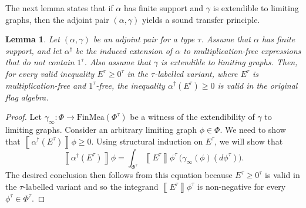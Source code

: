 \documentclass{article}
\newtheorem{lem}[thm]{Lemma}
\newcommand*{\db}[1]{\left\llbracket #1 \right\rrbracket}
\newcommand*{\FinMea}{\mathrm{FinMea}}
\begin{document}
The next lemma states that if $\alpha$ has finite support and $\gamma$ is extendible to limiting graphs, then the adjoint pair $(\alpha,\gamma)$ yields a sound transfer principle.
\begin{lem}
  \label{lemma:adjoint-transfer}
  Let $(\alpha,\gamma)$ be an adjoint pair for a type $\tau$.
  Assume that $\alpha$ has finite support, and let $\alpha^\dagger$ be the induced extension of $\alpha$ to multiplication-free expressions that do not contain $1^\tau$.
  Also assume that $\gamma$ is extendible to limiting graphs.
  Then, for every valid inequality $E^\tau \geq 0^\tau$ in the $\tau$-labelled variant, where $E^\tau$ is multiplication-free and $1^\tau$-free, the inequality $\alpha^\dagger(E^\tau) \geq 0$ is valid in the original flag algebra.
\end{lem}
\begin{proof}
  Let $\gamma_\infty : \Phi \to \FinMea(\Phi^\tau)$ be a witness of the extendibility 
  of $\gamma$ to limiting graphs.
  Consider an arbitrary limiting graph $\phi \in \Phi$. We need to show that $\db{\alpha^\dagger(E^\tau)}\phi \geq 0$. 
  Using structural induction on $E^\tau$, we will show that 
  \begin{equation}
    \label{eq:lem:adjoint-transfer0}
    \db{\alpha^\dagger(E^\tau)}\phi = \int_{\Phi^\tau} \db{E^\tau}\phi^\tau \,\Big(\gamma_\infty(\phi)(d\phi^\tau)\Big).
  \end{equation}
  The desired conclusion then follows from this equation because $E^\tau \geq 0^\tau$ is valid in the $\tau$-labelled variant
  and so the integrand $\db{E^\tau}\phi^\tau$ is non-negative for every $\phi^\tau \in \Phi^\tau$.


\end{proof}
\end{document}
